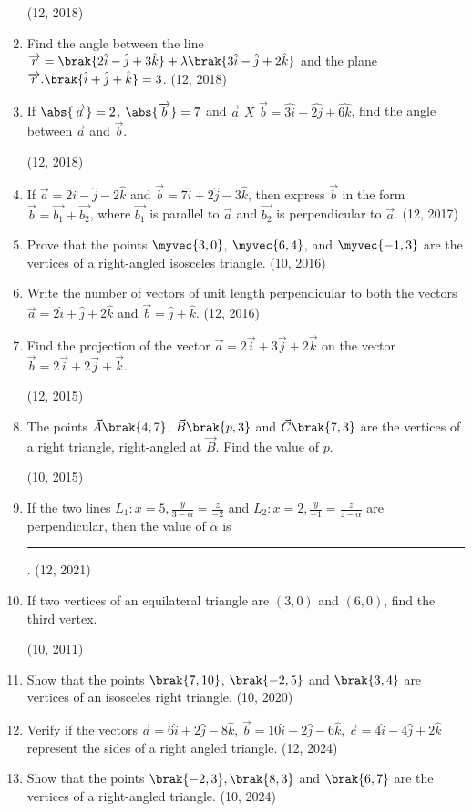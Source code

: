 \begin{enumerate}[label=\thesubsection.\arabic*, ref=\thesubsection.\theenumi]
\hfill (12, 2018)
\item Find the angle between the line $\overrightarrow{r}=\brak{2\hat{i}-\hat{j}+3\hat{k}}+\lambda\brak{3\hat{i}-\hat{j}+2\hat{k}}$ and the plane $\overrightarrow{r}.\brak{\hat{i}+\hat{j}+\hat{k}}=3$.
\hfill (12, 2018) 
\item If $\abs{\overrightarrow{a}}=2$, $\abs{\overrightarrow{b}}=7$ and  $\overrightarrow{a}$ $X$ $\overrightarrow{b} =\hat{3i}+\hat{2j}+\hat{6k}$, find the angle between $\overrightarrow{a}$ and $\overrightarrow{b}$.

\hfill (12, 2018) 
    \item If $\vec{a} = 2\hat{i} - \hat{j} - 2\hat{k}$ and $\vec{b} = 7\hat{i} + 2\hat{j} - 3\hat{k}$, then express $\vec{b}$ in the form $\vec{b} = \vec{b_1} + \vec{b_2}$, where $\vec{b_1}$ is parallel to $\vec{a}$ and $\vec{b_2}$ is perpendicular to $\vec{a}$. \hfill (12, 2017)
    \item Prove that the points $\myvec{3,0}$, $\myvec{6,4}$, and $\myvec{-1,3}$ are the vertices of a right-angled isosceles triangle. \hfill (10, 2016)
\item Write the number of vectors of unit length perpendicular to both the vectors
          $\vec{a}  = 2 \hat{i} + \hat{j} +2\hat{k}$  and 
          $\vec{b}  = \hat{j}+\hat{k}$.
\hfill (12, 2016)
\item Find the projection of the vector $\vec{a}=2\overrightarrow{i}+3\overrightarrow{j}+2\overrightarrow{k}$ on the vector $\vec{b}=2\overrightarrow{i}+2\overrightarrow{j}+\overrightarrow{k}$.

	\hfill (12, 2015)
\item The points $\vec{A}\brak{4, 7}$, $\vec{B}\brak{p, 3}$ and $\vec{C}\brak{7, 3}$ are the vertices of a right triangle, right-angled at $\vec{B}$. Find the value of $p$.

	\hfill (10, 2015)
\item If the two lines
     $L_1 : x=5,\frac{y}{3-\alpha}=\frac{z}{-2}$ and
     $L_2 : x=2,\frac{y}{-1}=\frac{z}{z-\alpha}$ 
are perpendicular, then the value of $\alpha$  is \rule{1cm}{0.2pt}.
\hfill (12, 2021)
    \item If two vertices of an equilateral triangle are $(3,0)$ and $(6,0)$, find the third vertex.   

\hfill (10, 2011)
\item Show that the points $\brak{7, 10}$, $\brak{-2, 5}$ and $\brak{3, 4}$ are vertices of an isosceles right triangle.
\hfill (10, 2020)
\item Verify if 
the vectors 
$\overrightarrow{a}=6\hat{i}+2\hat{j}-8\hat{k}$, 
$\overrightarrow{b} = 10\hat{i}-2\hat{j}-6\hat{k}$,  
$\overrightarrow{c} = 4\hat{i}-4\hat{j}+2\hat{k}$  
represent the sides of a right angled triangle.                  
		\hfill (12, 2024)
\item Show that the points $\brak{-2,3}, \brak{8,3}$ and $\brak{6,7} $ are the vertices of a right-angled triangle.
\hfill	(10, 2024)
\end{enumerate}
